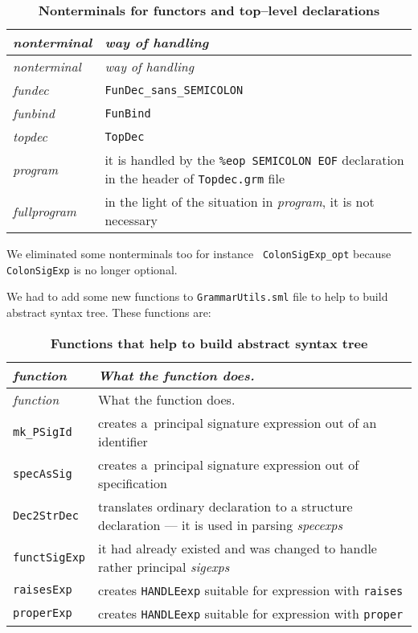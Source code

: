 \begin{longtable}{lp{80mm}}
\caption[Nonterminals for functors and top--level declarations]%
{\bf  Nonterminals for functors and top--level declarations}\\
\sl nonterminal& \sl way of handling\\[5pt]
\endfirsthead
\sl nonterminal& \sl way of handling\\[5pt]
\endhead
\endfoot
{\it fundec} & {\tt FunDec\_sans\_SEMICOLON}\\
{\it funbind} & {\tt FunBind}\\
{\it topdec} & {\tt TopDec}\\
{\it program} & it is handled by the {\tt \%eop     SEMICOLON EOF}
declaration in the header of {\tt Topdec.grm} file\\
{\it fullprogram} & in the light of the situation in {\it program}, it
is not necessary
\end{longtable}

We eliminated some nonterminals too for instance {\tt
  ColonSigExp\_opt} because {\tt ColonSigExp} is no longer optional.

We had to add some new functions to {\tt GrammarUtils.sml} file to
help to build abstract syntax tree. These functions are:
\begin{longtable}{lp{80mm}}
\caption[Functions that help to build abstract syntax tree]{\bf
  Functions that help to build abstract syntax tree}\\ 
\sl function& \sl What the function does.\\[5pt]  
\endfirsthead
\sl function& What the function does.\\[5pt]
\endhead
\endfoot
{\tt mk\_PSigId} &  creates a~principal signature
expression out of an identifier\\ 
{\tt specAsSig} & creates  a~principal signature
expression out of specification\\ 
{\tt Dec2StrDec} & translates ordinary declaration to a structure
declaration --- it is used in parsing {\it specexps}\\
{\tt functSigExp} & it had already existed and was changed to handle
rather principal {\it sigexps}\\
{\tt raisesExp} & creates {\tt HANDLEexp} suitable for expression with
{\tt raises} 
\\
{\tt properExp} & creates {\tt HANDLEexp} suitable for expression with
{\tt proper}\\
\end{longtable}

